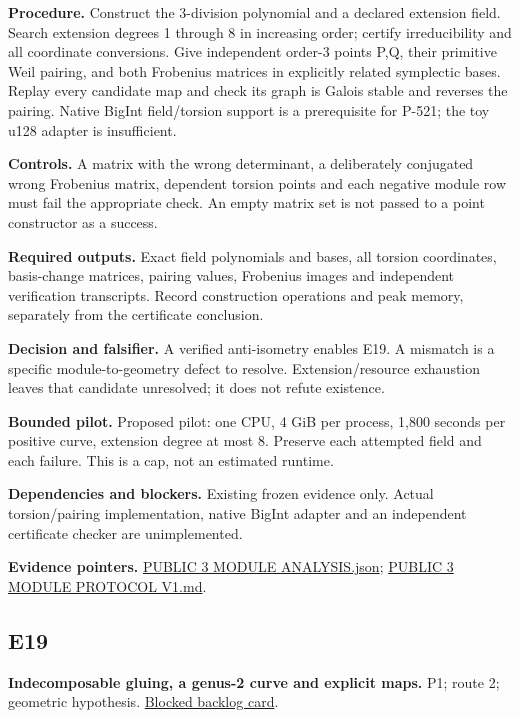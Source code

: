 \documentclass[
  10pt,
]{article}
\begin{document}
\textbf{Procedure.} Construct the 3-division polynomial and a declared
extension field. Search extension degrees 1 through 8 in increasing
order; certify irreducibility and all coordinate conversions. Give
independent order-3 points P,Q, their primitive Weil pairing, and both
Frobenius matrices in explicitly related symplectic bases. Replay every
candidate map and check its graph is Galois stable and reverses the
pairing. Native BigInt field/torsion support is a prerequisite for
P-521; the toy u128 adapter is insufficient.

\textbf{Controls.} A matrix with the wrong determinant, a deliberately
conjugated wrong Frobenius matrix, dependent torsion points and each
negative module row must fail the appropriate check. An empty matrix set
is not passed to a point constructor as a success.

\textbf{Required outputs.} Exact field polynomials and bases, all
torsion coordinates, basis-change matrices, pairing values, Frobenius
images and independent verification transcripts. Record construction
operations and peak memory, separately from the certificate conclusion.

\textbf{Decision and falsifier.} A verified anti-isometry enables E19. A
mismatch is a specific module-to-geometry defect to resolve.
Extension/resource exhaustion leaves that candidate unresolved; it does
not refute existence.

\textbf{Bounded pilot.} Proposed pilot: one CPU, 4 GiB per process,
1,800 seconds per positive curve, extension degree at most 8. Preserve
each attempted field and each failure. This is a cap, not an estimated
runtime.

\textbf{Dependencies and blockers.} Existing frozen evidence only.
Actual torsion/pairing implementation, native BigInt adapter and an
independent certificate checker are unimplemented.

\textbf{Evidence pointers.}
\href{../../../research/twist_routes_1_3_20261021/reports/execution-20261022T0032Z/PUBLIC_3_MODULE_ANALYSIS.json}{PUBLIC
3 MODULE ANALYSIS.json};
\href{../../../research/twist_routes_1_3_20261021/PUBLIC_3_MODULE_PROTOCOL_V1.md}{PUBLIC
3 MODULE PROTOCOL V1.md}.

\subsection{E19}\label{e19}

\textbf{Indecomposable gluing, a genus-2 curve and explicit maps.} P1;
route 2; geometric hypothesis.
\href{../../../backlog/XP-20261022-twist-three-gluing-geometry/README.md}{Blocked
backlog card}.
\end{document}
